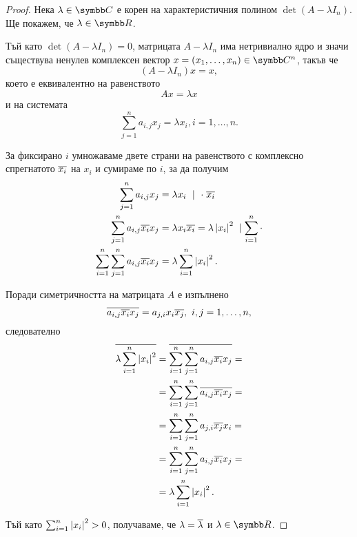 \documentclass[
  headings=standardclasses,
  bibliography=totocnumbered,
]{scrartcl}
\begin{document}
\begin{proof}
  Нека \( \lambda \in \Complex \) е корен на характеристичния полином \( \det(A - \lambda I_n) \). Ще покажем, че \( \lambda \in \R \).

  Тъй като \( \det(A - \lambda I_n) = 0 \), матрицата \( A - \lambda I_n \) има нетривиално ядро и значи съществува ненулев комплексен вектор \( x = (x_1, \ldots, x_n) \in \Complex^n \), такъв че
  \begin{equation*}
    (A - \lambda I_n) x = x,
  \end{equation*}
  което е еквивалентно на равенството
  \begin{equation*}
    A x = \lambda x
  \end{equation*}
  и на системата
  \begin{equation*}
    \sum_{j=1}^n a_{i,j} x_j = \lambda x_i, i = 1, \ldots, n.
  \end{equation*}

  За фиксирано \( i \) умножаваме двете страни на равенството с комплексно спрегнатото \( \overline{x_i} \) на \( x_i \) и сумираме по \( i \), за да получим
  \begin{align*}
    \sum_{j=1}^n a_{i,j} x_j
    &=
    \lambda x_i \ \mid \ \cdot \; \overline{x_i}
    \\
    \sum_{j=1}^n a_{i,j} \overline{x_i} x_j
    &=
    \lambda x_i \overline{x_i} = \lambda \left\vert x_i \right\vert^2\; \mid \sum_{i=1}^n \cdot
    \\
    \sum_{i=1}^n \sum_{j=1}^n a_{i,j} \overline{x_i} x_j
    &=
    \lambda \sum_{i=1}^n \left\vert x_i \right\vert^2.
  \end{align*}

  Поради симетричността на матрицата \( A \) е изпълнено
  \begin{equation*}
    \overline{a_{i,j} \overline{x_i} x_j}
    =
    a_{j,i} x_i \overline{x_j},~i, j = 1, \ldots, n,
  \end{equation*}
  следователно
  \begin{align*}
    \overline{\lambda \sum_{i=1}^n \left\vert x_i \right\vert^2}
    &=
    \overline{\sum_{i=1}^n \sum_{j=1}^n a_{i,j} \overline{x_i} x_j}
    = \\ &=
    \sum_{i=1}^n \sum_{j=1}^n \overline{a_{i,j} \overline{x_i} x_j}
    = \\ &=
    \sum_{i=1}^n \sum_{j=1}^n a_{j,i} \overline{x_j} x_i
    = \\ &=
    \sum_{i=1}^n \sum_{j=1}^n a_{i,j} \overline{x_i} x_j
    = \\ &=
    \lambda \sum_{i=1}^n \left\vert x_i \right\vert^2.
  \end{align*}

  Тъй като \( \sum_{i=1}^n \left\vert x_i \right\vert^2 > 0 \), получаваме, че \( \lambda = \overline{\lambda} \) и \( \lambda \in \R \).
\end{proof}
\end{document}
